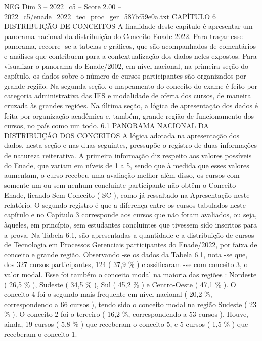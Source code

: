 \begin{textsample}{NEG Dim 3 – 2022\_c5 – Score 2.00 – 2022\_c5/enade\_2022\_tec\_proc\_ger\_587bf59e0a.txt}  \label{ex:f3_neg_220}
CAPÍTULO 6 DISTRIBUIÇÃO DE CONCEITOS A finalidade deste capítulo é apresentar um panorama nacional da distribuição do Conceito Enade 2022.
Para traçar esse panorama, recorre -se a tabelas e gráficos, que são acompanhados de comentários e análises que contribuem para a contextualização dos dados neles expostos.
Para visualizar o panorama do Enade/2002, em nível nacional, na primeira seção do capítulo, os dados sobre o número de cursos participantes são organizados por grande região.
Na segunda seção, o mapeamento do conceito do exame é feito por categoria administrativa das IES e modalidade de oferta dos cursos, de maneira cruzada às grandes regiões.
Na última seção, a lógica de apresentação dos dados é feita por organização acadêmica e, também, grande região de funcionamento dos cursos, no país como um todo. 6.1 PANORAMA NACIONAL DA DISTRIBUIÇÃO DOS CONCEITOS A lógica adotada na apresentação dos dados, nesta seção e nas duas seguintes, pressupõe o registro de duas informações de natureza reiterativa.
A primeira informação diz respeito aos valores possíveis do Enade, que variam em níveis de 1 a 5, sendo que à medida que esses valores aumentam, o curso recebeu uma avaliação melhor além disso, os cursos com somente um ou sem nenhum concluinte participante não obtêm o Conceito Enade, ficando Sem Conceito ( SC ), como já ressaltado na Apresentação neste relatório.
O segundo registro é que a diferença entre os cursos tabulados neste capítulo e no Capítulo 3 corresponde aos cursos que não foram avaliados, ou seja, àqueles, em princípio, sem estudantes concluintes que tivessem sido inscritos para a prova.
Na Tabela 6.1, são apresentadas a quantidade e a distribuição de cursos de Tecnologia em Processos Gerenciais participantes do Enade/2022, por faixa de conceito e grande região.
Observando -se os dados da Tabela 6.1, nota -se que, dos 327 cursos participantes, 124 ( 37,9 \% ) classificaram -se com conceito 3, o valor modal.
Esse foi também o conceito modal na maioria das regiões : Nordeste ( 26,5 \% ), Sudeste ( 34,5 \% ), Sul ( 45,2 \% ) e Centro-Oeste ( 47,1 \% ).
O conceito 4 foi o segundo mais frequente em nível nacional ( 20,2 \%, correspondendo a 66 cursos ), tendo sido o conceito modal na região Sudeste ( 23 \% ).
O conceito 2 foi o terceiro ( 16,2 \%, correspondendo a 53 cursos ).
Houve, ainda, 19 cursos ( 5,8 \% ) que receberam o conceito 5, e 5 cursos ( 1,5 \% ) que receberam o conceito 1.

\end{textsample}
